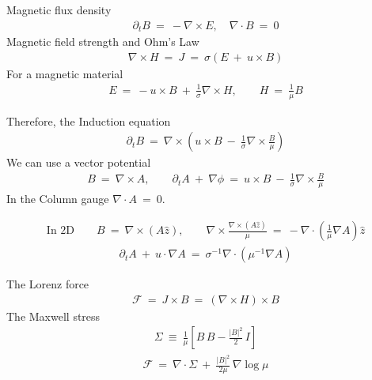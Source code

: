 \documentclass[12pt,preprint]{article}
\newcommand\Beq{\begin{eqnarray}}
\newcommand\Eeq{\end{eqnarray}}
\newcommand{\pd}[1]{\partial_{#1}}
\newcommand{\dat}{\cdot}
\newcommand{\grad}{\nabla}
\renewcommand{\div}{\nabla \dat}
\begin{document}
Magnetic flux density
\Beq
\pd{t} B \ = \ - \grad \times E, \quad \div B  \ = \ 0
\Eeq
Magnetic field strength and Ohm's Law
\Beq
\grad \times H \ = \ J \ = \ \sigma \left( E \ + \ u \times B \right)
\Eeq
For a magnetic material 
\Beq
E \ = \ - u \times B \ + \ \frac{1}{\sigma} \grad \times H , \quad \quad H \ = \ \frac{1}{\mu} B
\Eeq

Therefore, the Induction equation 
\Beq
\pd{t}B \ = \ \grad \times \left( u \times B \ - \ \frac{1}{\sigma} \grad \times \frac{B}{\mu} \right)
\Eeq
We can use a vector potential 
\Beq
B \ = \ \grad \times A , \quad \quad
\pd{t}A \ + \ \grad \phi \ = \   u \times B \ - \ \frac{1}{\sigma} \grad \times \frac{B}{\mu} 
\Eeq
In the Column gauge $\div A  \ = \ 0$.

\Beq
\text{In 2D} \quad \quad B \ = \  \grad \times (A \hat{z}), \quad \quad
\grad \times \frac{\grad \times (A \hat{z})}{\mu}  \ = \ - \div \left(\frac{1}{\mu} \grad A\right) \hat{z}
\Eeq
\Beq
\pd{t} A \ + \    u \cdot \grad  A  \ = \ \sigma^{-1} \div \left( \mu^{-1} \grad A  \right)
\Eeq

The Lorenz force 
\Beq
\mathcal{F} \ = \ J \times B \ = \ (\grad \times H) \times B 
\Eeq
The Maxwell stress
\Beq
\Sigma \ \equiv \ \frac{1}{\mu} \left[ B\, B - \frac{|B|^{2}}{2}\, I \right]
\Eeq
\Beq
\mathcal{F} \ = \    \div \Sigma \ + \ \frac{|B|^{2}}{2\mu} \, \grad \log \mu
\Eeq
\end{document}
